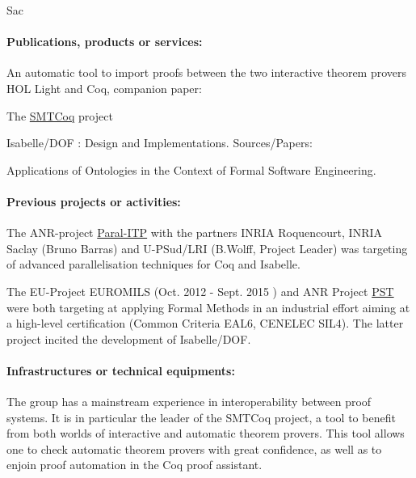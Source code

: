 \begin{sitedescription}{Sac}
\paragraph*{Publications, products or services:}

\begin{compactitem}
\item An automatic tool to import proofs between the two interactive
  theorem provers HOL Light and Coq, companion
  paper:~\cite{DBLP:conf/itp/KellerW10}
\item The \href{https://smtcoq.github.io}{SMTCoq} project
  \cite{DBLP:conf/cpp/ArmandFGKTW11,DBLP:conf/cav/EkiciMTKKRB17}
\item Isabelle/DOF : Design and Implementations.
 Sources/Papers: \cite{brucker_achim_d_2019_3370483,brucker.ea:isabelle-ontologies:2018}
\item Applications of Ontologies in the Context of Formal Software Engineering.
 \cite{brucker.ea:ontologies-certification:2019}
\end{compactitem}

\paragraph*{Previous projects or activities:}

\begin{compactitem}
\item The ANR-project \href{http://www.lri.fr/~wolff/projects/ANR-Paral-ITP/}{Paral-ITP} with the  
      partners INRIA Roquencourt, INRIA Saclay (Bruno Barras) 
      and U-PSud/LRI (B.Wolff, Project Leader) was targeting 
      of advanced parallelisation techniques for Coq and Isabelle.
\item The EU-Project EUROMILS (Oct. 2012 - Sept. 2015 ) and 
      ANR Project \href{http://www.irt-systemx.fr/en/project/pst/}{PST}
      were both targeting at applying Formal Methods in an industrial
      effort aiming at a high-level certification (Common Criteria EAL6, 
      CENELEC SIL4). The latter project incited the development of 
      Isabelle/DOF\cite{brucker_achim_d_2019_3370483}.
\end{compactitem} 

\paragraph*{Infrastructures or technical equipments:}

The group has a mainstream experience in interoperability between proof
systems. It is in particular the leader of the SMTCoq project, a tool to
benefit from both worlds of interactive and automatic theorem provers.
This tool allows one to check automatic theorem provers with great
confidence, as well as to enjoin proof automation in the Coq proof
assistant.


\end{sitedescription}
